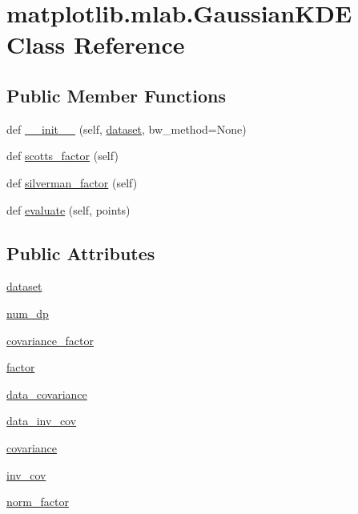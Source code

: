 \hypertarget{classmatplotlib_1_1mlab_1_1GaussianKDE}{}\section{matplotlib.\+mlab.\+Gaussian\+K\+DE Class Reference}
\label{classmatplotlib_1_1mlab_1_1GaussianKDE}
\subsection*{Public Member Functions}
\begin{DoxyCompactItemize}
\item 
def \hyperlink{classmatplotlib_1_1mlab_1_1GaussianKDE_ae94de5d99f517b843ee2a836847ef3b5}{\+\_\+\+\_\+init\+\_\+\+\_\+} (self, \hyperlink{classmatplotlib_1_1mlab_1_1GaussianKDE_a1a9bfcd3c9f4567b042757386e564b10}{dataset}, bw\+\_\+method=None)
\item 
def \hyperlink{classmatplotlib_1_1mlab_1_1GaussianKDE_ac36963e4ffac27c198101dcdd2c9f59a}{scotts\+\_\+factor} (self)
\item 
def \hyperlink{classmatplotlib_1_1mlab_1_1GaussianKDE_ab7bc555187ab1ca936ab70d8e226e5e2}{silverman\+\_\+factor} (self)
\item 
def \hyperlink{classmatplotlib_1_1mlab_1_1GaussianKDE_a0b346469b60aebcc4781f7f1573df770}{evaluate} (self, points)
\end{DoxyCompactItemize}
\subsection*{Public Attributes}
\begin{DoxyCompactItemize}
\item 
\hyperlink{classmatplotlib_1_1mlab_1_1GaussianKDE_a1a9bfcd3c9f4567b042757386e564b10}{dataset}
\item 
\hyperlink{classmatplotlib_1_1mlab_1_1GaussianKDE_a0b43f2fe33abbdd2801eeea8d7babb2c}{num\+\_\+dp}
\item 
\hyperlink{classmatplotlib_1_1mlab_1_1GaussianKDE_a234fd5ded024e253fcc692e76462d846}{covariance\+\_\+factor}
\item 
\hyperlink{classmatplotlib_1_1mlab_1_1GaussianKDE_a15cb36d35b9cfa203189aeeab65c00ee}{factor}
\item 
\hyperlink{classmatplotlib_1_1mlab_1_1GaussianKDE_a3dc8b423013082f8402222a15b6f25de}{data\+\_\+covariance}
\item 
\hyperlink{classmatplotlib_1_1mlab_1_1GaussianKDE_ac06e1fc4e862d5c8b042214359f13743}{data\+\_\+inv\+\_\+cov}
\item 
\hyperlink{classmatplotlib_1_1mlab_1_1GaussianKDE_a1f80a5911d5ddbb4771ade800b14f81b}{covariance}
\item 
\hyperlink{classmatplotlib_1_1mlab_1_1GaussianKDE_a1db8e5df6a322713b9ac95229373c491}{inv\+\_\+cov}
\item 
\hyperlink{classmatplotlib_1_1mlab_1_1GaussianKDE_a0730da7cf3c4dd22f0ec127d0b1fb4ee}{norm\+\_\+factor}
\end{DoxyCompactItemize}
